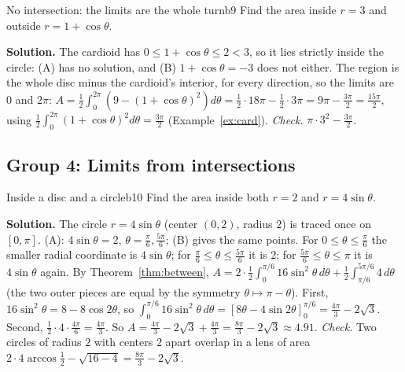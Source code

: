\documentclass[11pt]{article}
\begin{document}
\begin{exmp}{No intersection: the limits are the whole turn}{b9}
Find the area inside $r=3$ and outside $r=1+\cos\theta$.

\textbf{Solution.} The cardioid has $0\le1+\cos\theta\le2<3$, so it lies strictly inside the circle: (A) has no solution, and (B) $1+\cos\theta=-3$ does not either. The region is the whole disc minus the cardioid's interior, for every direction, so the limits are $0$ and $2\pi$: $A=\frac12\int_0^{2\pi}\left(9-(1+\cos\theta)^2\right)d\theta=\frac12\cdot18\pi-\frac12\cdot3\pi=9\pi-\frac{3\pi}2=\frac{15\pi}2$, using $\frac12\int_0^{2\pi}(1+\cos\theta)^2d\theta=\frac{3\pi}2$ (Example~\ref{ex:card}). \emph{Check.} $\pi\cdot3^2-\frac{3\pi}2$.
\end{exmp}

\subsection*{Group 4: Limits from intersections}

\begin{exmp}{Inside a disc and a circle}{b10}
Find the area inside both $r=2$ and $r=4\sin\theta$.

\textbf{Solution.} The circle $r=4\sin\theta$ (center $(0,2)$, radius $2$) is traced once on $[0,\pi]$. (A): $4\sin\theta=2$, $\theta=\frac\pi6,\frac{5\pi}6$; (B) gives the same points. For $0\le\theta\le\frac\pi6$ the smaller radial coordinate is $4\sin\theta$; for $\frac\pi6\le\theta\le\frac{5\pi}6$ it is $2$; for $\frac{5\pi}6\le\theta\le\pi$ it is $4\sin\theta$ again. By Theorem~\ref{thm:between}, $A=2\cdot\frac12\int_0^{\pi/6}16\sin^2\theta\,d\theta+\frac12\int_{\pi/6}^{5\pi/6}4\,d\theta$ (the two outer pieces are equal by the symmetry $\theta\mapsto\pi-\theta$). First, $16\sin^2\theta=8-8\cos2\theta$, so $\int_0^{\pi/6}16\sin^2\theta\,d\theta=\left[8\theta-4\sin2\theta\right]_0^{\pi/6}=\frac{4\pi}3-2\sqrt3$. Second, $\frac12\cdot4\cdot\frac{4\pi}6=\frac{4\pi}3$. So $A=\frac{4\pi}3-2\sqrt3+\frac{4\pi}3=\frac{8\pi}3-2\sqrt3\approx4.91$. \emph{Check.} Two circles of radius $2$ with centers $2$ apart overlap in a lens of area $2\cdot4\arccos\frac12-\sqrt{16-4}=\frac{8\pi}3-2\sqrt3$.
\end{exmp}
\end{document}
